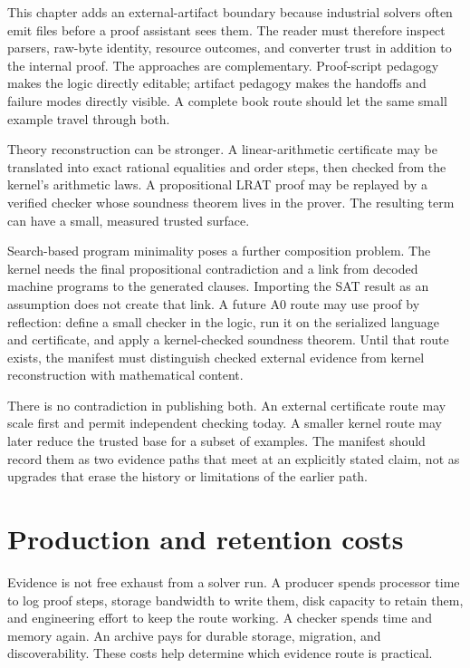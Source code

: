 This chapter adds an external-artifact boundary because industrial solvers
often emit files before a proof assistant sees them. The reader must therefore
inspect parsers, raw-byte identity, resource outcomes, and converter trust in
addition to the internal proof. The approaches are complementary. Proof-script
pedagogy makes the logic directly editable; artifact pedagogy makes the
handoffs and failure modes directly visible. A complete book route should let
the same small example travel through both.

Theory reconstruction can be stronger. A linear-arithmetic certificate may be
translated into exact rational equalities and order steps, then checked from
the kernel's arithmetic laws. A propositional LRAT proof may be replayed by a
verified checker whose soundness theorem lives in the prover. The resulting
term can have a small, measured trusted surface.

Search-based program minimality poses a further composition problem. The
kernel needs the final propositional contradiction and a link from decoded
machine programs to the generated clauses. Importing the SAT
result as an assumption does not create that link. A future A0 route may use
proof by reflection: define a small checker in the logic, run it on the
serialized language and certificate, and apply a kernel-checked soundness theorem.
Until that route exists, the manifest must distinguish checked external
evidence from kernel reconstruction with mathematical content.

There is no contradiction in publishing both. An external certificate route
may scale first and permit independent checking today. A smaller kernel route
may later reduce the trusted base for a subset of examples. The manifest should
record them as two evidence paths that meet at an explicitly stated claim, not
as upgrades that erase the history or limitations of the earlier path.

\section{Production and retention costs}

Evidence is not free exhaust from a solver run. A producer spends processor
time to log proof steps, storage bandwidth to write them, disk capacity to
retain them, and engineering effort to keep the route working. A checker
spends time and memory again. An archive pays for durable storage, migration,
and discoverability. These costs help determine which evidence route is
practical.

